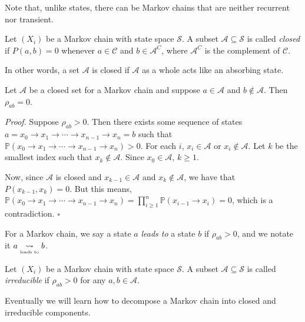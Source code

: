 \documentclass{problemset}
\renewcommand{\P}{\mathbb{P}}
\newcommand{\ldsto}{\underset{\text{\tiny leads to}}{\leadsto}}
\newenvironment{proof}{\emph{Proof.}}{\hfill$\square$}
\begin{document}
	Note that, unlike states, there can be Markov chains that are neither recurrent nor transient.

	\begin{definition}[Closed]
		Let $(X_i)$ be a Markov chain with state space $\mathcal S$.  A subset $\mathcal A\subseteq \mathcal S$ is
		called \emph{closed} if $P(a,b)=0$ whenever $a\in \mathcal C$ and $b\in \mathcal A^C$, where $\mathcal A^C$ is
		the complement of $\mathcal C$.
	\end{definition}

	In other words, a set $\mathcal A$ is closed if $\mathcal A$ as a whole acts like
	an absorbing state.

	\begin{lemma}
		Let $\mathcal A$ be a closed set for a Markov chain and suppose $a\in \mathcal A$ and $b\notin \mathcal A$.
		Then $\rho_{ab} = 0$.
	\end{lemma}
	\begin{proof}
		Suppose $\rho_{ab}>0$.  Then there exists some sequence of states $a=x_0\to x_1\to\cdots\to x_{n-1}\to x_{n}=b$
		such that $\P(x_0\to x_1\to\cdots\to x_{n-1}\to x_{n})>0$.  For each $i$, $x_i\in \mathcal A$ or $x_i\notin\mathcal A$.
		Let $k$ be the smallest index such that $x_k\notin \mathcal A$.  Since $x_0\in\mathcal A$, $k\geq 1$.

		Now, since $\mathcal A$ is closed and $x_{k-1}\in \mathcal A$ and $x_k\notin\mathcal A$, we have that $P(x_{k-1},x_k)=0$.
		But this means, $\P(x_0\to x_1\to\cdots\to x_{n-1}\to x_{n}) = \prod_{i\geq 1}^n \P(x_{i-1}\to x_i) = 0$, which
		is a contradiction.
	\end{proof}

	\begin{definition}[Leads To]
		For a Markov chain, we say a state $a$ \emph{leads to} a state $b$ if $\rho_{ab}>0$, and we
		notate it $a\ldsto b$.
	\end{definition}
	\begin{definition}[Irreducible]
		Let $(X_i)$ be a Markov chain with state space $\mathcal S$.  A subset $\mathcal A\subseteq\mathcal S$
		is called \emph{irreducible} if $\rho_{ab}>0$ for any $a,b\in\mathcal A$.
	\end{definition}

	Eventually we will learn how to decompose a Markov chain into closed and irreducible components.
\end{document}
